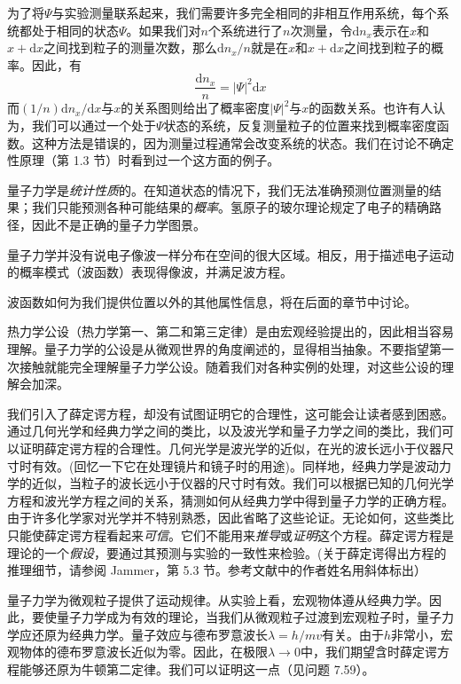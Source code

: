 	为了将$\Psi$与实验测量联系起来，我们需要许多完全相同的非相互作用系统，每个系统都处于相同的状态$\Psi$。如果我们对$n$个系统进行了$n$次测量，令$\mathrm{d}n_x$表示在$x$和$x+\mathrm{d}x$之间找到粒子的测量次数，那么$\mathrm{d}n_x/n$就是在$x$和$x+\mathrm{d}x$之间找到粒子的概率。因此，有
	\begin{equation*}
		\frac{\mathrm{d}n_x}{n} = \left|\Psi\right|^2\mathrm{d}x
	\end{equation*}
	而$\left(1/n\right) \mathrm{d}n_x / \mathrm{d}x$与$x$的关系图则给出了概率密度$\left|\Psi\right|^2$与$x$的函数关系。也许有人认为，我们可以通过一个处于$\Psi$状态的系统，反复测量粒子的位置来找到概率密度函数。这种方法是错误的，因为测量过程通常会改变系统的状态。我们在讨论不确定性原理（第 1.3 节）时看到过一个这方面的例子。

	量子力学是\textit{统计性质}的。在知道状态的情况下，我们无法准确预测位置测量的结果；我们只能预测各种可能结果的\textit{概率}。氢原子的玻尔理论规定了电子的精确路径，因此不是正确的量子力学图景。

	量子力学并没有说电子像波一样分布在空间的很大区域。相反，用于描述电子运动的概率模式（波函数）表现得像波，并满足波方程。

	波函数如何为我们提供位置以外的其他属性信息，将在后面的章节中讨论。

	热力学公设（热力学第一、第二和第三定律）是由宏观经验提出的，因此相当容易理解。量子力学的公设是从微观世界的角度阐述的，显得相当抽象。不要指望第一次接触就能完全理解量子力学公设。随着我们对各种实例的处理，对这些公设的理解会加深。

	我们引入了薛定谔方程，却没有试图证明它的合理性，这可能会让读者感到困惑。通过几何光学和经典力学之间的类比，以及波光学和量子力学之间的类比，我们可以证明薛定谔方程的合理性。几何光学是波光学的近似，在光的波长远小于仪器尺寸时有效。(回忆一下它在处理镜片和镜子时的用途)。同样地，经典力学是波动力学的近似，当粒子的波长远小于仪器的尺寸时有效。我们可以根据已知的几何光学方程和波光学方程之间的关系，猜测如何从经典力学中得到量子力学的正确方程。由于许多化学家对光学并不特别熟悉，因此省略了这些论证。无论如何，这些类比只能使薛定谔方程看起来\textit{可信}。它们不能用来\textit{推导}或\textit{证明}这个方程。薛定谔方程是理论的一个\textit{假设}，要通过其预测与实验的一致性来检验。(关于薛定谔得出方程的推理细节，请参阅 Jammer，第 5.3 节。参考文献中的作者姓名用斜体标出）

	量子力学为微观粒子提供了运动规律。从实验上看，宏观物体遵从经典力学。因此，要使量子力学成为有效的理论，当我们从微观粒子过渡到宏观粒子时，量子力学应还原为经典力学。量子效应与德布罗意波长$\lambda=h/mv$有关。由于$h$非常小，宏观物体的德布罗意波长近似为零。因此，在极限$\lambda \rightarrow 0$中，我们期望含时薛定谔方程能够还原为牛顿第二定律。我们可以证明这一点（见问题 7.59）。

